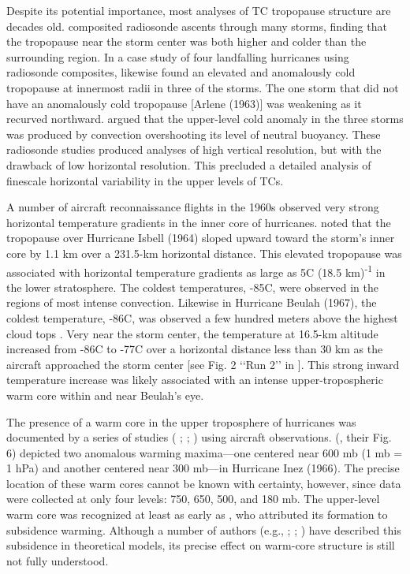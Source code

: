 Despite its potential importance, most analyses of TC tropopause structure are decades old.
\cite{JordanJordan1954} composited radiosonde ascents through many storms, finding that the tropopause near the storm center was both higher and colder than the surrounding region.
In a case study of four landfalling hurricanes using radiosonde composites, \cite{Koteswaram1967} likewise found an elevated and anomalously cold tropopause at innermost radii in three of the storms.
The one storm that did not have an anomalously cold tropopause [Arlene (1963)] was weakening as it recurved northward.
\cite{Koteswaram1967} argued that the upper-level cold anomaly in the three storms was produced by convection overshooting its level of neutral buoyancy.
These radiosonde studies produced analyses of high vertical resolution, but with the drawback of low horizontal resolution.
This precluded a detailed analysis of finescale horizontal variability in the upper levels of TCs.

A number of aircraft reconnaissance flights in the 1960s observed very strong horizontal temperature gradients in the inner core of hurricanes.
\cite{Penn1966} noted that the tropopause over Hurricane Isbell (1964) sloped upward toward the storm’s inner core by 1.1 km over a 231.5-km horizontal distance.
This elevated tropopause was associated with horizontal temperature gradients as large as 5\textdegree{}C (18.5 km)\textsuperscript{-1} in the lower stratosphere.
The coldest temperatures, -85\textdegree{}C, were observed in the regions of most intense convection.
Likewise in Hurricane Beulah (1967), the coldest temperature, -86\textdegree{}C, was observed a few hundred meters above the highest cloud tops \citep{Waco1970}.
Very near the storm center, the temperature at 16.5-km altitude increased from -86\textdegree{}C to -77\textdegree{}C over a horizontal distance less than 30 km as the aircraft approached the storm center [see Fig. 2 ‘‘Run 2’’ in \cite{Waco1970}].
This strong inward temperature increase was likely associated with an intense upper-tropospheric warm core within and near Beulah’s eye.

The presence of a warm core in the upper troposphere of hurricanes was documented by a series of studies (\citeauthor{LaSeurHawkins1963} \citeyear{LaSeurHawkins1963}; \citeauthor{HawkinsRubsam1968} \citeyear{HawkinsRubsam1968}; \citeauthor{HawkinsImbembo1976} \citeyear{HawkinsImbembo1976}) using aircraft observations.
\citeauthor{HawkinsImbembo1976} (\citeyear{HawkinsImbembo1976}, their Fig. 6) depicted two anomalous warming maxima---one centered near 600 mb (1 mb = 1 hPa) and another centered near 300 mb---in Hurricane Inez (1966).
The precise location of these warm cores cannot be known with certainty, however, since data were collected at only four levels: 750, 650, 500, and 180 mb.
The upper-level warm core was recognized at least as early as \cite{Haurwitz1935}, who attributed its formation to subsidence warming.
Although a number of authors (e.g., \citeauthor{Malkus1958} \citeyear{Malkus1958}; \citeauthor{Willoughby1979} \citeyear{Willoughby1979}; \citeauthor{Smith1980} \citeyear{Smith1980}) have described this subsidence in theoretical models, its precise effect on warm-core structure is still not fully understood.

